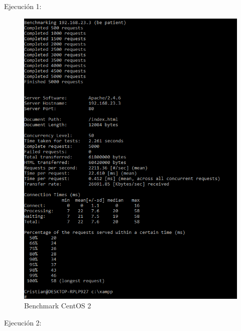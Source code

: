 \begin{enumerate}
		Ejecución 1:
		
		\begin{figure}[H] %
			\centering
			\includegraphics[scale=0.4]{pics/xamppCent2}  %
			\caption{Benchmark CentOS 2} \label{fig:cen2}
		\end{figure}
		
		Ejecución 2:
		

\end{enumerate}
